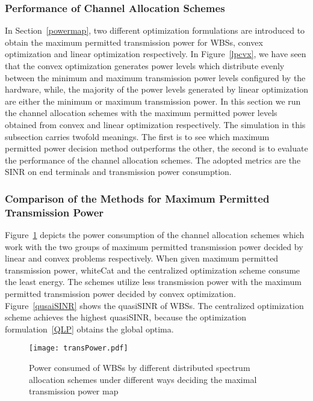      


\subsubsection*{Performance of Channel Allocation Schemes}
In Section~\ref{powermap}, two different optimization formulations are introduced to obtain the maximum permitted transmission power for WBSs, \ie convex optimization and linear optimization respectively.
In Figure~\ref{lpcvx}, we have seen that the convex optimization generates power levels which distribute evenly between the minimum and maximum transmission power levels configured by the hardware, while, the majority of the power levels generated by linear optimization are either the minimum or maximum transmission power.
In this section we run the channel allocation schemes with the maximum permitted power levels obtained from convex and linear optimization respectively.
The simulation in this subsection carries twofold meanings.
The first is to see which maximum permitted power decision method outperforms the other, the second is to evaluate the performance of the channel allocation schemes.
The adopted metrics are the SINR on end terminals and transmission power consumption.



\subsubsection*{Comparison of the Methods for Maximum Permitted Transmission Power}
 
Figure~\ref{transPower} depicts the power consumption of the channel allocation schemes which work with the two groups of maximum permitted transmission power decided by linear and convex problems respectively.
When given maximum permitted transmission power, whiteCat and the centralized optimization scheme consume the least energy.
The schemes utilize less transmission power with the maximum permitted transmission power decided by convex optimization.
%
Figure~\ref{qusaiSINR} shows the quasiSINR of WBSs.
The centralized optimization scheme achieves the highest quasiSINR, because the optimization formulation~\ref{QLP} obtains the global optima.
 \begin{figure}[h!]
    \centering
      \texttt{[image: transPower.pdf]}
    \caption{Power consumed of WBSs by different distributed spectrum allocation schemes under different ways deciding the maximal transmission power map}
\label{transPower}    
  \end{figure}
  
